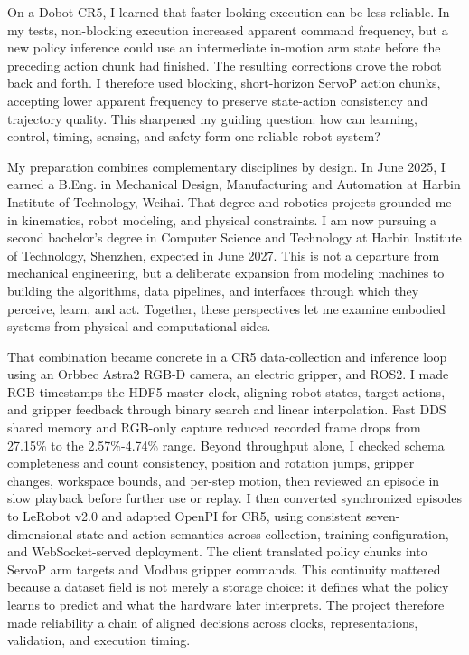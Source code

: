 On a Dobot CR5, I learned that faster-looking execution can be less reliable. In my tests, non-blocking execution increased apparent command frequency, but a new policy inference could use an intermediate in-motion arm state before the preceding action chunk had finished. The resulting corrections drove the robot back and forth. I therefore used blocking, short-horizon ServoP action chunks, accepting lower apparent frequency to preserve state-action consistency and trajectory quality. This sharpened my guiding question: how can learning, control, timing, sensing, and safety form one reliable robot system?

My preparation combines complementary disciplines by design. In June 2025, I earned a B.Eng. in Mechanical Design, Manufacturing and Automation at Harbin Institute of Technology, Weihai. That degree and robotics projects grounded me in kinematics, robot modeling, and physical constraints. I am now pursuing a second bachelor's degree in Computer Science and Technology at Harbin Institute of Technology, Shenzhen, expected in June 2027. This is not a departure from mechanical engineering, but a deliberate expansion from modeling machines to building the algorithms, data pipelines, and interfaces through which they perceive, learn, and act. Together, these perspectives let me examine embodied systems from physical and computational sides.

That combination became concrete in a CR5 data-collection and inference loop using an Orbbec Astra2 RGB-D camera, an electric gripper, and ROS2. I made RGB timestamps the HDF5 master clock, aligning robot states, target actions, and gripper feedback through binary search and linear interpolation. Fast DDS shared memory and RGB-only capture reduced recorded frame drops from 27.15\% to the 2.57\%-4.74\% range. Beyond throughput alone, I checked schema completeness and count consistency, position and rotation jumps, gripper changes, workspace bounds, and per-step motion, then reviewed an episode in slow playback before further use or replay. I then converted synchronized episodes to LeRobot v2.0 and adapted OpenPI for CR5, using consistent seven-dimensional state and action semantics across collection, training configuration, and WebSocket-served deployment. The client translated policy chunks into ServoP arm targets and Modbus gripper commands. This continuity mattered because a dataset field is not merely a storage choice: it defines what the policy learns to predict and what the hardware later interprets. The project therefore made reliability a chain of aligned decisions across clocks, representations, validation, and execution timing.

